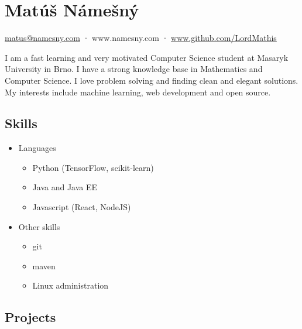 \documentclass[a4,12pt]{article}
\providecommand{\tightlist}{%
  \setlength{\itemsep}{0pt}\setlength{\parskip}{0pt}}
\begin{document}
\section*{Matúš Námešný}


\begin{center}
\href{mailto:matus@namesny.com}{matus@namesny.com} · www.namesny.com · \href{www.github.com/LordMathis}{www.github.com/LordMathis}
\end{center}

I am a fast learning and very motivated Computer Science student at
Masaryk University in Brno. I have a strong knowledge base in
Mathematics and Computer Science. I love problem solving and finding
clean and elegant solutions. My interests include machine learning, web
development and open source.


\subsection*{Skills}\label{skills}

\begin{itemize}
\tightlist
\item
  Languages
  \begin{itemize}
  \tightlist
  \item
    Python (TensorFlow, scikit-learn)
  \item
    Java and Java EE
  \item
    Javascript (React, NodeJS)
  \end{itemize}
\item
  Other skills
  \begin{itemize}
  \tightlist
  \item
    git
  \item
    maven
  \item
    Linux administration
  \end{itemize}
\end{itemize}

\subsection*{Projects}\label{projects}
\end{document}
